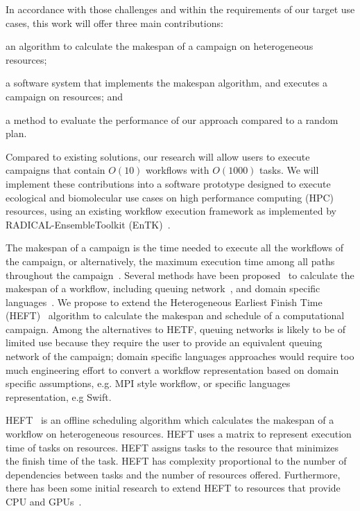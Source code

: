 In accordance with those challenges and within the requirements of our target 
use cases, this work will offer three main contributions: 
\begin{inparaenum}[(1)]
\item an algorithm to calculate the makespan of a campaign on heterogeneous 
resources;
\item a software system that implements the makespan algorithm, and executes a 
campaign on resources; and 
\item a method to evaluate the performance of our approach compared to a random 
plan. 
\end{inparaenum}
Compared to existing solutions, our research will allow users to execute 
campaigns that contain $O(10)$ workflows with $O(1000)$ tasks. We will implement 
these contributions into a software prototype designed to execute ecological 
and biomolecular use cases on high performance computing (HPC) resources, using 
an existing workflow execution framework as implemented by RADICAL-EnsembleToolkit 
(EnTK)~\cite{balasubramanian2018harnessing}.

The makespan of a campaign is the time needed to execute all the workflows of 
the campaign, or alternatively, the maximum execution time among all paths 
throughout the campaign~\cite{chirkin2017execution}. Several methods have been 
proposed~\cite{lu2019review} to calculate the makespan of a workflow, including 
queuing network~\cite{yao2019throughput,bao2019performance}, and domain specific 
languages~\cite{carothers2017durango,maheshwari2016workflow}. We propose to 
extend the Heterogeneous Earliest Finish Time (HEFT)~\cite{topcuoglu2002performance} 
algorithm to calculate the makespan and schedule of a computational campaign. 
Among the alternatives to HETF, queuing networks is likely to be of limited use 
because they require the user to provide an equivalent queuing network of the 
campaign; domain specific languages approaches would require too much engineering 
effort to convert a workflow representation based on domain specific assumptions, 
e.g. MPI style workflow, or specific languages representation, e.g Swift.

HEFT~\cite{topcuoglu2002performance} is an offline scheduling algorithm which 
calculates the makespan of a workflow on heterogeneous resources. HEFT uses a 
matrix to represent execution time of tasks on resources. HEFT assigns tasks to 
the resource that minimizes the finish time of the task. HEFT has complexity 
proportional to the number of dependencies between tasks and the number of 
resources offered. Furthermore, there has been some initial research to extend 
HEFT to resources that provide CPU and GPUs~\cite{shetti2013optimization}. 

